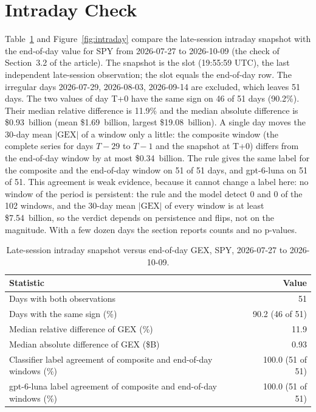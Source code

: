 \section{Intraday Check}
\label{sup:intraday}

Table~\ref{tab:intraday} and Figure~\ref{fig:intraday} compare the late-session intraday snapshot with the end-of-day value for SPY from 2026-07-27 to 2026-10-09 (the check of Section~3.2 of the article).
The snapshot is the  slot (19:55:59 UTC), the last independent late-session observation; the  slot equals the end-of-day row. The irregular days 2026-07-29, 2026-08-03, 2026-09-14 are excluded, which leaves 51 days. The two values of day T+0 have the same sign on 46 of 51 days (90.2\%). Their median relative difference is 11.9\% and the median absolute difference is \$0.93~billion (mean \$1.69~billion, largest \$19.08~billion). A single day moves the 30-day mean $|\mathrm{GEX}|$ of a window only a little: the composite window (the complete series for days $T{-}29$ to $T{-}1$ and the snapshot at T+0) differs from the end-of-day window by at most \$0.34~billion. The rule gives the same label for the composite and the end-of-day window on 51 of 51 days, and gpt-6-luna on 51 of 51. This agreement is weak evidence, because it cannot change a label here: no window of the period is persistent: the rule and the model detect 0 and 0 of the 102 windows, and the 30-day mean $|\mathrm{GEX}|$ of every window is at least \$7.54~billion, so the verdict depends on persistence and flips, not on the magnitude. With a few dozen days the section reports counts and no p-values.

\begin{table}[H]
\centering
\caption{Late-session intraday snapshot versus end-of-day GEX, SPY, 2026-07-27 to 2026-10-09.}
\label{tab:intraday}
\footnotesize
\begin{tabular}{@{}lr@{}}
\toprule
Statistic & Value \\
\midrule
Days with both observations & 51 \\
Days with the same sign (\%) & 90.2 (46 of 51) \\
Median relative difference of GEX (\%) & 11.9 \\
Median absolute difference of GEX (\$B) & 0.93 \\
Classifier label agreement of composite and end-of-day windows (\%) & 100.0 (51 of 51) \\
gpt-6-luna label agreement of composite and end-of-day windows (\%) & 100.0 (51 of 51) \\
\bottomrule
\end{tabular}
\end{table}

